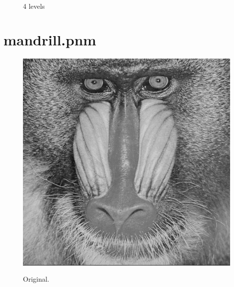 \documentclass[english]{article}
\begin{document}
\begin{figure}[!htb]
  \caption{4 levels}\label{fig:awesome_image3}
\endminipage
\end{figure}


\newpage
\section{mandrill.pnm}
\begin{figure}[H]
	\centering
  \includegraphics[width=.5\linewidth]{../images/mandrill.png}
  \label{fig:fig1}
  \caption{Original.}
\end{figure}
\end{document}
